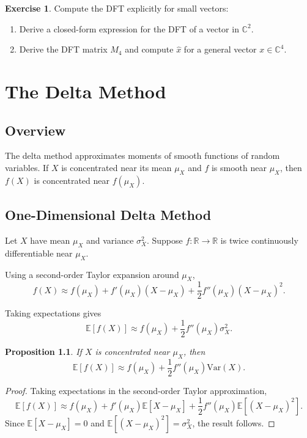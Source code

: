\documentclass[12pt,oneside]{book}
\numberwithin{equation}{section}
\theoremstyle{definition}
\newtheorem{exercise}{Exercise}[section]
\theoremstyle{plain}
\newtheorem{proposition}{Proposition}[section]
\theoremstyle{remark}
\newcommand{\R}{\mathbb{R}}
\newcommand{\C}{\mathbb{C}}
\newcommand{\E}{\mathbb{E}}
\newcommand{\Var}{\mathrm{Var}}
\begin{document}
\begin{exercise}
Compute the DFT explicitly for small vectors:
\begin{enumerate}
\item Derive a closed-form expression for the DFT of a vector in $\C^2$.
\item Derive the DFT matrix $M_4$ and compute $\hat{x}$ for a general vector $x \in \C^4$.
\end{enumerate}
\end{exercise}

\chapter{The Delta Method}

\section{Overview}

The delta method approximates moments of smooth functions of random variables. If $X$ is concentrated near its mean $\mu_X$ and $f$ is smooth near $\mu_X$, then $f(X)$ is concentrated near $f(\mu_X)$.

\section{One-Dimensional Delta Method}

Let $X$ have mean $\mu_X$ and variance $\sigma_X^2$. Suppose $f:\R \to \R$ is twice continuously differentiable near $\mu_X$.

Using a second-order Taylor expansion around $\mu_X$,
\[
f(X) \approx f(\mu_X) + f'(\mu_X)(X-\mu_X)
+ \frac{1}{2}f''(\mu_X)(X-\mu_X)^2.
\]

Taking expectations gives
\[
\E[f(X)] \approx f(\mu_X) + \frac{1}{2}f''(\mu_X)\sigma_X^2.
\]

\begin{proposition}
If $X$ is concentrated near $\mu_X$, then
\[
\E[f(X)] \approx f(\mu_X) + \frac{1}{2}f''(\mu_X)\Var(X).
\]
\end{proposition}

\begin{proof}
Taking expectations in the second-order Taylor approximation,
\[
\E[f(X)]
\approx f(\mu_X)
+ f'(\mu_X)\E[X-\mu_X]
+ \frac{1}{2}f''(\mu_X)\E[(X-\mu_X)^2].
\]
Since $\E[X-\mu_X]=0$ and $\E[(X-\mu_X)^2]=\sigma_X^2$, the result follows.
\end{proof}
\end{document}

